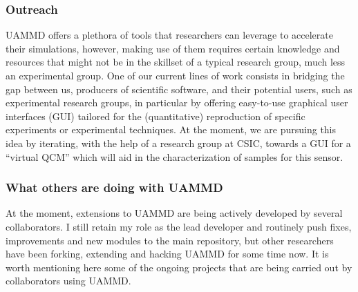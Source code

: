 \documentclass[ twoside,openright,titlepage,numbers=noenddot,%
headinclude,footinclude,cleardoublepage=empty,abstract=on,
BCOR=5mm,paper=b5,fontsize=11pt, dvipsnames
]{scrreprt}
\begin{document}
\subsubsection*{Outreach}
UAMMD offers a plethora of tools that researchers can leverage to accelerate their simulations, however, making use of them requires certain knowledge and resources that might not be in the skillset of a typical research group, much less an experimental group. One of our current lines of work consists in bridging the gap between us, producers of scientific software, and their potential users, such as experimental research groups, in particular by offering easy-to-use graphical user interfaces (GUI) tailored for the (quantitative) reproduction of specific experiments or experimental techniques. At the moment, we are pursuing this idea by iterating, with the help of a research group at CSIC, towards a GUI for a ``virtual QCM'' which will aid in the characterization of samples for this sensor.

\subsubsection*{What others are doing with UAMMD}
At the moment, extensions to UAMMD are being actively developed by several collaborators. I still retain my role as the lead developer and routinely push fixes, improvements and new modules to the main repository, but other researchers have been forking, extending and hacking UAMMD for some time now. It is worth mentioning here some of the ongoing projects that are being carried out by collaborators using UAMMD.
\end{document}
